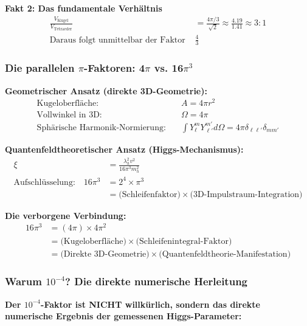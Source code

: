 \documentclass[12pt,a4paper]{article}
\theoremstyle{definition}
\begin{document}
\textbf{Fakt 2: Das fundamentale Verhältnis}
\begin{align}
	\frac{V_{\text{Kugel}}}{V_{\text{Tetraeder}}} &= \frac{4\pi/3}{\sqrt{2}} \approx \frac{4.19}{1.41} \approx 3:1 \\
	\text{Daraus folgt unmittelbar der Faktor } &\frac{4}{3}
\end{align}

\subsubsection{Die parallelen $\pi$-Faktoren: 4$\pi$ vs. 16$\pi^3$}
\label{subsubsec:parallel_pi_factors}

\textbf{Geometrischer Ansatz (direkte 3D-Geometrie):}
\begin{align}
	\text{Kugeloberfläche:} \quad &A = 4\pi r^2 \\
	\text{Vollwinkel in 3D:} \quad &\Omega = 4\pi \\
	\text{Sphärische Harmonik-Normierung:} \quad &\int Y_{\ell}^m Y_{\ell'}^{m'} d\Omega = 4\pi \delta_{\ell\ell'}\delta_{mm'}
\end{align}

\textbf{Quantenfeldtheoretischer Ansatz (Higgs-Mechanismus):}
\begin{align}
	\xi &= \frac{\lambda_h^2 v^2}{16\pi^3 m_h^2} \\
	\text{Aufschlüsselung:} \quad 16\pi^3 &= 2^4 \times \pi^3 \\
	&= \text{(Schleifenfaktor)} \times \text{(3D-Impulstraum-Integration)}
\end{align}

\textbf{Die verborgene Verbindung:}
\begin{align}
	16\pi^3 &= (4\pi) \times 4\pi^2 \\
	&= \text{(Kugeloberfläche)} \times \text{(Schleifenintegral-Faktor)} \\
	&= \text{(Direkte 3D-Geometrie)} \times \text{(Quantenfeldtheorie-Manifestation)}
\end{align}

\subsubsection{Warum $10^{-4}$? Die direkte numerische Herleitung}
\label{subsubsec:direct_numerical_derivation}

\textbf{Der $10^{-4}$-Faktor ist NICHT willkürlich, sondern das direkte numerische Ergebnis der gemessenen Higgs-Parameter:}
\end{document}

